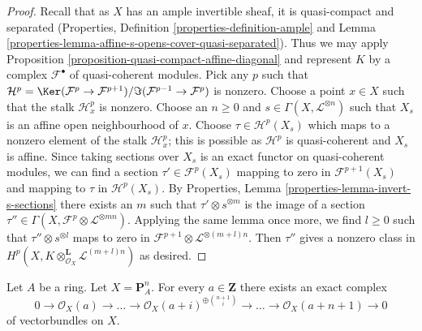 \begin{proof}
Recall that as $X$ has an ample invertible sheaf, it is quasi-compact
and separated (Properties, Definition \ref{properties-definition-ample} and
Lemma \ref{properties-lemma-affine-s-opens-cover-quasi-separated}).
Thus we may apply
Proposition \ref{proposition-quasi-compact-affine-diagonal}
and represent $K$ by a complex $\mathcal{F}^\bullet$ of
quasi-coherent modules. Pick any $p$ such that
$\mathcal{H}^p = \Ker(\mathcal{F}^p \to \mathcal{F}^{p + 1})/
\Im(\mathcal{F}^{p - 1} \to \mathcal{F}^p)$ is nonzero.
Choose a point $x \in X$ such that the stalk $\mathcal{H}^p_x$ is
nonzero. Choose an $n \geq 0$ and $s \in \Gamma(X, \mathcal{L}^{\otimes n})$
such that $X_s$ is an affine open neighbourhood of $x$.
Choose $\tau \in \mathcal{H}^p(X_s)$ which maps to a nonzero
element of the stalk $\mathcal{H}^p_x$; this is possible
as $\mathcal{H}^p$ is quasi-coherent and $X_s$ is affine.
Since taking sections over $X_s$ is an exact functor on
quasi-coherent modules, we can find a section $\tau' \in \mathcal{F}^p(X_s)$
mapping to zero in $\mathcal{F}^{p + 1}(X_s)$ and mapping to
$\tau$ in $\mathcal{H}^p(X_s)$. By
Properties, Lemma \ref{properties-lemma-invert-s-sections}
there exists an $m$ such that $\tau' \otimes s^{\otimes m}$
is the image of a section
$\tau'' \in \Gamma(X, \mathcal{F}^p \otimes \mathcal{L}^{\otimes mn})$.
Applying the same lemma once more, we find $l \geq 0$ such that
$\tau'' \otimes s^{\otimes l}$ maps to zero in
$\mathcal{F}^{p + 1} \otimes \mathcal{L}^{\otimes (m + l)n}$.
Then $\tau''$ gives a nonzero class in
$H^p(X, K \otimes^\mathbf{L}_{\mathcal{O}_X} \mathcal{L}^{(m + l)n})$
as desired.
\end{proof}

\begin{lemma}
\label{lemma-construct-the-next-one}
Let $A$ be a ring. Let $X = \mathbf{P}^n_A$. For every $a \in \mathbf{Z}$
there exists an exact complex
$$
0 \to \mathcal{O}_X(a) \to \ldots
\to \mathcal{O}_X(a + i)^{\oplus {n + 1 \choose i}} \to
\ldots \to \mathcal{O}_X(a + n + 1) \to 0
$$
of vectorbundles on $X$.
\end{lemma}

